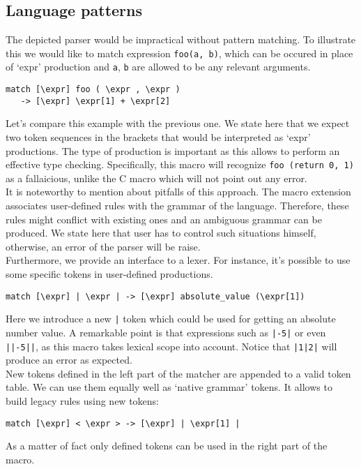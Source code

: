 \subsection{Language patterns}
The depicted parser would be impractical without pattern matching. To
illustrate this we 
would like to match expression \verb|foo(a, b)|, which can be occured in place 
of `expr' production and \verb|a|, \verb|b| are allowed to be any relevant
arguments.
\begin{verbatim}
match [\expr] foo ( \expr , \expr ) 
   -> [\expr] \expr[1] + \expr[2]
\end{verbatim}
Let's compare this example with the previous one. We state here that we expect
two token sequences in the brackets that would be interpreted as `expr'
productions. The type of production is important as this allows to perform an 
effective type checking. Specifically, this macro will recognize 
\verb|foo (return 0, 1)| as a fallaicious, unlike the C macro which will not
point out any error. \\
It is noteworthy to mention about pitfalls of this approach. The macro
extension associates user-defined rules with the grammar of the language.
Therefore, these rules might conflict with existing ones and an ambiguous
grammar can be produced. We state here that user has to control such situations
himself, otherwise, an error of the parser will be raise. \\
Furthermore, we provide an interface to a lexer. For instance, it's possible to
use some specific tokens in user-defined productions.
\begin{verbatim}
match [\expr] | \expr | -> [\expr] absolute_value (\expr[1])
\end{verbatim}
Here we introduce a new \verb/|/ token which could be used for getting an
absolute number value. A remarkable point is that expressions such as 
\verb/|-5|/ or even \verb/||-5||/, as this macro takes lexical scope into
account. Notice that \verb/|1|2|/ will produce an error as expected. \\
New tokens defined in the left part of the matcher are appended to a valid token
table. We can use them equally well as `native grammar' tokens. It allows to
build legacy rules using new tokens:
\begin{verbatim}
match [\expr] < \expr > -> [\expr] | \expr[1] |
\end{verbatim}
As a matter of fact only defined tokens can be used in the right part of the macro. 




